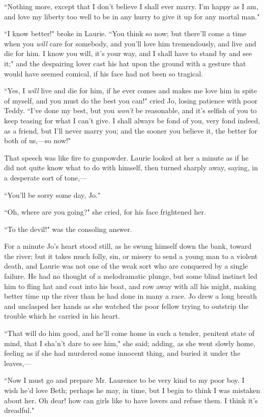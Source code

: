 ``Nothing more, except that I don't believe I shall ever
marry. I'm happy as I am, and love my liberty too well
to be in any hurry to give it up for any mortal man."

``I know better!" broke in Laurie. ``You think so now; but
there'll come a time when you \emph{will} care for
somebody, and you'll love him tremendously, and live and
die for him. I know you will, it's your way, and I shall
have to stand by and see it;" and the despairing lover cast his hat upon
the ground with a gesture that would have seemed comical, if his face
had not been so tragical.

``Yes, I \emph{will} live and die for him, if he ever comes and makes me
love him in spite of myself, and you must do the best you can!" cried
Jo, losing patience with poor Teddy. ``I've done my best,
but you \emph{won't} be reasonable, and
it's selfish of you to keep teasing for what I
can't give. I shall always be fond of you, very fond
indeed, as a friend, but I'll never marry you; and the
sooner you believe it, the better for both of us,---so now!"

That speech was like fire to gunpowder. Laurie looked at her a minute as
if he did not quite know what to do with himself, then turned sharply
away, saying, in a desperate sort of tone,---

``You'll be sorry some day, Jo."

``Oh, where are you going?" she cried, for his face frightened her.

``To the devil!" was the consoling answer.

For a minute Jo's heart stood still, as he swung himself
down the bank, toward the river; but it takes much folly, sin, or misery
to send a young man to a violent death, and Laurie was not one of the
weak sort who are conquered by a single failure. He had no thought of a
melodramatic plunge, but some blind instinct led him to fling hat and
coat into his boat, and row away with all his might, making better time
up the river than he had done in many a race. Jo drew a long breath and
unclasped her hands as she watched the poor fellow trying to outstrip
the trouble which he carried in his heart.

``That will do him good, and he'll come home in such a
tender, penitent state of mind, that I
sha'n't dare to see him," she said;
adding, as she went slowly home, feeling as if she had murdered some
innocent thing, and buried it under the leaves,---

``Now I must go and prepare Mr. Laurence to be very kind to my poor boy.
I wish he'd love Beth; perhaps he may, in time, but I
begin to think I was mistaken about her. Oh dear! how can girls like to
have lovers and refuse them. I think it's dreadful."

